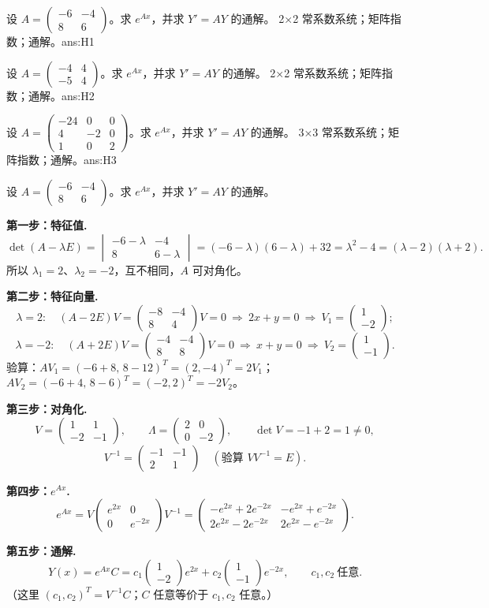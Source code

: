 \documentclass[11pt]{ctexart}
\newcommand{\pmat}[1]{\begin{pmatrix}#1\end{pmatrix}}
\begin{document}
%
{设 $A=\pmat{-6&-4\\8&6}$。求 $e^{Ax}$，并求 $Y'=AY$ 的通解。}%
{2×2 常系数系统；矩阵指数；通解。}{ans:H1}

%
{设 $A=\pmat{-4&4\\-5&4}$。求 $e^{Ax}$，并求 $Y'=AY$ 的通解。}%
{2×2 常系数系统；矩阵指数；通解。}{ans:H2}

%
{设 $A=\pmat{-24&0&0\\4&-2&0\\1&0&2}$。求 $e^{Ax}$，并求 $Y'=AY$ 的通解。}%
{3×3 常系数系统；矩阵指数；通解。}{ans:H3}

\clearpage
\appendix
{}

%
{设 $A=\pmat{-6&-4\\8&6}$。求 $e^{Ax}$，并求 $Y'=AY$ 的通解。}

\textbf{第一步：特征值.}
\[
\det(A-\lambda E)=\begin{vmatrix}-6-\lambda&-4\\8&6-\lambda\end{vmatrix}
=(-6-\lambda)(6-\lambda)+32=\lambda^2-4=(\lambda-2)(\lambda+2).
\]
所以 $\lambda_1=2$、$\lambda_2=-2$，互不相同，$A$ 可对角化。

\textbf{第二步：特征向量.}
\[
\lambda=2:\quad (A-2E)V=\pmat{-8&-4\\8&4}V=0\ \Rightarrow\ 2x+y=0\ \Rightarrow\ V_1=\pmat{1\\-2};
\]
\[
\lambda=-2:\quad (A+2E)V=\pmat{-4&-4\\8&8}V=0\ \Rightarrow\ x+y=0\ \Rightarrow\ V_2=\pmat{1\\-1}.
\]
验算：$AV_1=(-6+8,\,8-12)^T=(2,-4)^T=2V_1$；
$AV_2=(-6+4,\,8-6)^T=(-2,2)^T=-2V_2$。

\textbf{第三步：对角化.}
\[
V=\pmat{1&1\\-2&-1},\qquad \Lambda=\pmat{2&0\\0&-2},\qquad
\det V=-1+2=1\ne0,
\]
\[
V^{-1}=\pmat{-1&-1\\2&1}
\quad(\text{验算 }VV^{-1}=E).
\]

\textbf{第四步：$e^{Ax}$.}
\[
e^{Ax}=V\pmat{e^{2x}&0\\0&e^{-2x}}V^{-1}
=\pmat{-e^{2x}+2e^{-2x}&-e^{2x}+e^{-2x}\\[2pt]2e^{2x}-2e^{-2x}&2e^{2x}-e^{-2x}}.
\]

\textbf{第五步：通解.}
\[
Y(x)=e^{Ax}C
=c_1\pmat{1\\-2}e^{2x}+c_2\pmat{1\\-1}e^{-2x},\qquad c_1,c_2\ \text{任意}.
\]
（这里 $(c_1,c_2)^T=V^{-1}C$；$C$ 任意等价于 $c_1,c_2$ 任意。）
\end{document}
